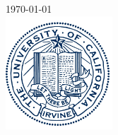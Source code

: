 \documentclass[12pt]{article}
\begin{document}
\begin{titlepage}

{\large \today}\\[2cm] %


\includegraphics[width=0.3\textwidth]{pics/logo.jpg}


\vfill %

\end{titlepage}










%
%
\normalsize
%
\end{document}
